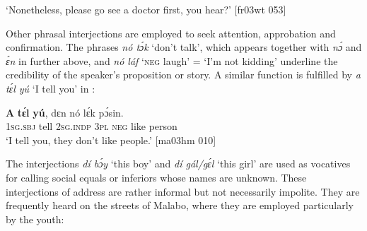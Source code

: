 \glt ‘Nonetheless, please go see a doctor first, you hear?’ [fr03wt 053]
\z


\ea%
    \label{ex:key:1659}
\z\z

Other phrasal interjections are employed to seek attention, approbation and confirmation. The phrases \textit{nó tɔ́k} ‘don’t talk’, which appears together with \textit{nɔ́} and \textit{ɛ́n} in  further above, and \textit{nó láf} ‘\textsc{neg} laugh’ = ‘I’m not kidding’  underline the credibility of the speaker’s proposition or story. A similar function is fulfilled by \textit{a tɛ́l yú} ‘I tell you’ in :


\ea%
    \label{ex:key:1660}
\z\z


\ea%
    \label{ex:key:1661}
    \gll \textbf{A}    \textbf{tɛ́l}  \textbf{yú},    dɛn  nó  lɛ́k  pɔ́sin.\\
\textsc{1sg.sbj}  tell  \textsc{2sg.indp}  \textsc{3pl}  \textsc{neg}  like  person\\

\glt ‘I tell you, they don’t like people.’ [ma03hm 010]
\z

The interjections \textit{dí bɔ́y} ‘this boy’ and \textit{dí gál/gɛ́l} ‘this girl’ are used as vocatives{\fff} for calling social equals or inferiors whose names are unknown. These interjections of address are rather informal but not necessarily impolite. They are frequently heard on the streets of Malabo, where they are employed particularly by the youth: 


